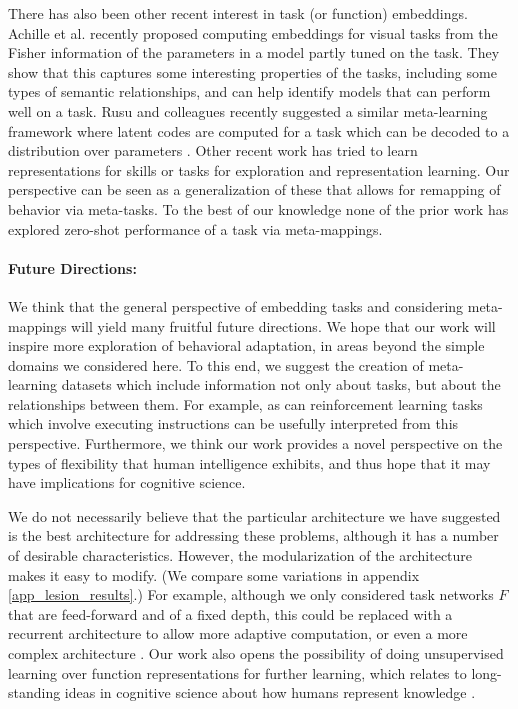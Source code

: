 \documentclass{article}
\begin{document}
There has also been other recent interest in task (or function) embeddings. Achille et al. \citep{Achille2019} recently proposed computing embeddings for visual tasks from the Fisher information of the parameters in a model partly tuned on the task. They show that this captures some interesting properties of the tasks, including some types of semantic relationships, and can help identify models that can perform well on a task. Rusu and colleagues recently suggested a similar meta-learning framework where latent codes are computed for a task which can be decoded to a distribution over parameters \citep{Rusu2019}. Other recent work has tried to learn representations for skills \citep[e.g.][]{Eysenbach2019} or tasks \citep[e.g.]{Hsu2019} for exploration and representation learning. Our perspective can be seen as a generalization of these that allows for remapping of behavior via meta-tasks. To the best of our knowledge none of the prior work has explored zero-shot performance of a task via meta-mappings. \par
 \vspace{-1em}
\paragraph{Future Directions:} We think that the general perspective of embedding tasks and considering meta-mappings will yield many fruitful future directions. We hope that our work will inspire more exploration of behavioral adaptation, in areas beyond the simple domains we considered here. To this end, we suggest the creation of meta-learning datasets which include information not only about tasks, but about the relationships between them. For example,  as can reinforcement learning tasks which involve executing instructions \citep[e.g.][]{Hermann2017, Co-Reyes2019} can be usefully interpreted from this perspective. Furthermore, we think our work provides a novel perspective on the types of flexibility that human intelligence exhibits, and thus hope that it may have implications for cognitive science. \par 
We do not necessarily believe that the particular architecture we have suggested is the best architecture for addressing these problems, although it has a number of desirable characteristics. However, the modularization of the architecture makes it easy to modify. (We compare some variations in appendix \ref{app_lesion_results}.) For example, although we only considered task networks $F$ that are feed-forward and of a fixed depth, this could be replaced with a recurrent architecture to allow more adaptive computation, or even a more complex architecture \citep[e.g.][]{Reed2015, Graves2016}. Our work also opens the possibility of doing unsupervised learning over function representations for further learning, which relates to long-standing ideas in cognitive science about how humans represent knowledge \citep{Clark1993}. \par 
\end{document}
